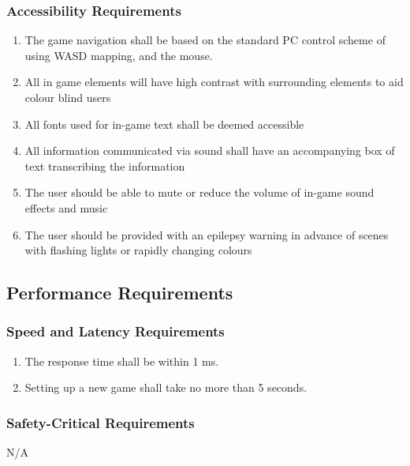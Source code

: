 \documentclass[12pt, titlepage]{article}
\begin{document}
\subsubsection{Accessibility Requirements}
\label{ssub:accessibility_requirements}
\begin{enumerate}[start=8,label={ UH\arabic*.}]
        \item The game navigation shall be based on the standard PC control scheme of using WASD mapping, and the mouse.
        \item All in game elements will have high contrast with surrounding elements to aid colour blind users
        \item All fonts used for in-game text shall be deemed accessible
        \item All information communicated via sound shall have an accompanying box of text transcribing the information
        \item The user should be able to mute or reduce the volume of in-game sound effects and music
        \item The user should be provided with an epilepsy warning in advance of scenes with flashing lights or rapidly changing colours

\end{enumerate}


\subsection{Performance Requirements}
\label{sub:performance_requirements}

\subsubsection{Speed and Latency Requirements}
\label{ssub:speed_and_latency_requirements}
\begin{enumerate}[{PR}1. ]
        \item The response time shall be within 1 ms.
        \item Setting up a new game shall take no more than 5 seconds.
\end{enumerate}

\subsubsection{Safety-Critical Requirements}
\label{ssub:safety_critical_requirements}
N/A
\end{document}
